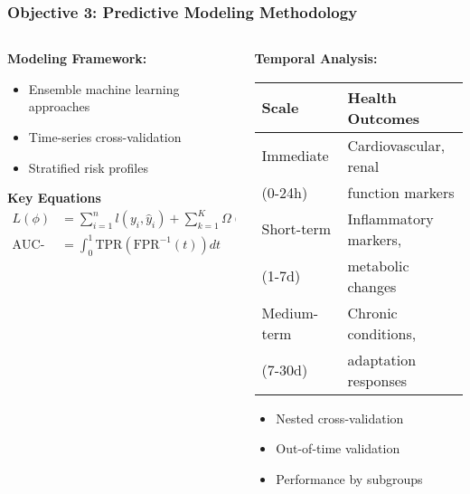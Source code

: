 \documentclass[aspectratio=169]{beamer}
\begin{document}
\begin{frame}
    \frametitle{Objective 3: Predictive Modeling Methodology}
    
    \begin{columns}[T]
        \begin{column}{0.55\textwidth}
            \textbf{\large Modeling Framework:}
            \begin{itemize}[leftmargin=*, itemsep=6pt]
                \item Ensemble machine learning approaches
                \item Time-series cross-validation
                \item Stratified risk profiles
            \end{itemize}
            
            \textbf{Key Equations}
            \begin{align*}
            L(\phi) &= \sum_{i=1}^{n}l(y_i, \hat{y}_i) + \sum_{k=1}^{K}\Omega(f_k) \\
            \text{AUC-ROC} &= \int_{0}^{1} \text{TPR}(\text{FPR}^{-1}(t))dt
            \end{align*}
        \end{column}
        \begin{column}{0.42\textwidth}
            \textbf{\large Temporal Analysis:}
            \begin{table}[h]
                \small
                \begin{tabular}{p{2cm}p{2.8cm}}
                    \toprule
                    \textbf{Scale} & \textbf{Health Outcomes} \\
                    \midrule
                    Immediate & Cardiovascular, renal \\
                    (0-24h) & function markers \\
                    \addlinespace
                    Short-term & Inflammatory markers, \\
                    (1-7d) & metabolic changes \\
                    \addlinespace
                    Medium-term & Chronic conditions, \\
                    (7-30d) & adaptation responses \\
                    \bottomrule
                \end{tabular}
            \end{table}
            
            \begin{infobox}
                \begin{itemize}[leftmargin=*, itemsep=4pt]
                    \item Nested cross-validation
                    \item Out-of-time validation
                    \item Performance by subgroups
                \end{itemize}
            \end{infobox}
        \end{column}
    \end{columns}
\end{frame}
\end{document}

